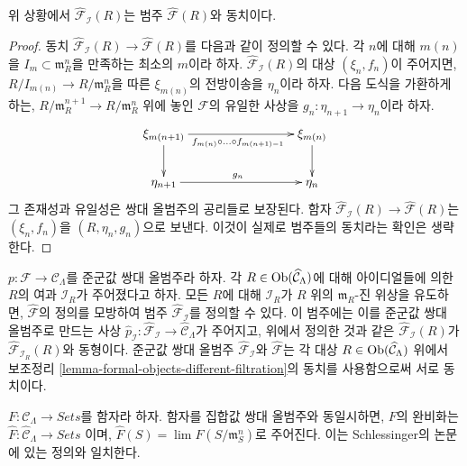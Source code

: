 \begin{lemma}
\label{lemma-formal-objects-different-filtration}
위 상황에서 $\widehat{\mathcal{F}}_\mathcal{I}(R)$는 범주
$\widehat{\mathcal{F}}(R)$와 동치이다.
\end{lemma}

\begin{proof}
동치 $\widehat{\mathcal{F}}_\mathcal{I}(R) \to
\widehat{\mathcal{F}}(R)$를 다음과 같이 정의할 수 있다. 각 $n$에 대해
$m(n)$을 $I_m \subset \mathfrak m_R^n$을 만족하는 최소의 $m$이라 하자.
$\widehat{\mathcal{F}}_\mathcal{I}(R)$의 대상 $(\xi_n, f_n)$이 주어지면,
$R/I_{m(n)} \to R/\mathfrak m_R^n$을 따른 $\xi_{m(n)}$의
전방이송을 $\eta_n$이라 하자. 다음 도식을 가환하게 하는,
$R/\mathfrak m_R^{n + 1} \to R/\mathfrak m_R^n$ 위에 놓인
$\mathcal{F}$의 유일한 사상을 $g_n : \eta_{n + 1} \to \eta_n$이라 하자.
$$
\xymatrix{
\xi_{m(n + 1)} \ar[rrr]_{f_{m(n)} \circ \ldots \circ f_{m(n + 1) - 1}} \ar[d]
& & & \xi_{m(n)} \ar[d] \\
\eta_{n + 1} \ar[rrr]^{g_n} & & & \eta_n
}
$$
그 존재성과 유일성은 쌍대 올범주의 공리들로 보장된다. 함자
$\widehat{\mathcal{F}}_\mathcal{I}(R) \to \widehat{\mathcal{F}}(R)$는
$(\xi_n, f_n)$을 $(R, \eta_n, g_n)$으로 보낸다. 이것이 실제로
범주들의 동치라는 확인은 생략한다.
\end{proof}

\begin{remark}
\label{remark-different-sequence-ideals}
$p : \mathcal{F} \to \mathcal{C}_\Lambda$를 준군값 쌍대
올범주라 하자. 각 $R \in \mathop{\mathrm{Ob}}\nolimits(\widehat{\mathcal{C}}_\Lambda)$에 대해
아이디얼들에 의한 $R$의 여과 $\mathcal{I}_R$가 주어졌다고 하자.
모든 $R$에 대해 $\mathcal{I}_R$가 $R$ 위의 $\mathfrak m_R$-진 위상을
유도하면, $\widehat{\mathcal{F}}$의 정의를 모방하여 범주
$\widehat{\mathcal{F}}_\mathcal{I}$를 정의할 수 있다. 이 범주에는
이를 준군값 쌍대 올범주로 만드는 사상
$\widehat{p}_\mathcal{I} : \widehat{\mathcal{F}}_\mathcal{I} \to
\widehat{\mathcal{C}}_\Lambda$가 주어지고, 위에서 정의한 것과 같은
$\widehat{\mathcal{F}}_\mathcal{I}(R)$가
$\widehat{\mathcal{F}}_{\mathcal{I}_R}(R)$와 동형이다. 준군값 쌍대
올범주 $\widehat{\mathcal{F}}_\mathcal{I}$와
$\widehat{\mathcal{F}}$는 각 대상
$R \in \mathop{\mathrm{Ob}}\nolimits(\widehat{\mathcal{C}}_\Lambda)$ 위에서 보조정리
\ref{lemma-formal-objects-different-filtration}의 동치를 사용함으로써
서로 동치이다.
\end{remark}

\begin{remark}
\label{remark-completion-functor}
$F: \mathcal{C}_\Lambda \to \textit{Sets}$를 함자라 하자.
함자를 집합값 쌍대 올범주와 동일시하면, $F$의 완비화는
$\widehat{F} : \widehat{\mathcal{C}}_\Lambda \to \textit{Sets}$
이며, $\widehat{F}(S) = \lim F(S/\mathfrak{m}_S^{n})$로 주어진다.
이는 Schlessinger의 논문 \cite{Sch}에 있는 정의와 일치한다.
\end{remark}

